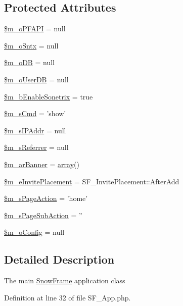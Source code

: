 \subsection*{Protected Attributes}
\begin{DoxyCompactItemize}
\item 
\hyperlink{classSF__App_a23d5b5190ee32c4eb8fff028844b1fa6}{\$m\_\-oPFAPI} = null
\item 
\hyperlink{classSF__App_a22d1091f94c58e3533304abe3eb9e9fe}{\$m\_\-oSntx} = null
\item 
\hyperlink{classSF__App_af0fd242fc474881efab473522eec0748}{\$m\_\-oDB} = null
\item 
\hyperlink{classSF__App_a480a834e33015cc9a001d1d84972bb12}{\$m\_\-oUserDB} = null
\item 
\hyperlink{classSF__App_a55534a049a693ced372dba4331e5e9bd}{\$m\_\-bEnableSonetrix} = true
\item 
\hyperlink{classSF__App_a21ffd6ebc459ccba9514cbaee05b2ece}{\$m\_\-sCmd} = 'show'
\item 
\hyperlink{classSF__App_a2db945fecc9d0f95e19093d7829be78d}{\$m\_\-sIPAddr} = null
\item 
\hyperlink{classSF__App_a251ed856d45aa28d717a012291b71d26}{\$m\_\-sReferrer} = null
\item 
\hyperlink{classSF__App_a03606a66e78d358c6094f05f0857845d}{\$m\_\-arBanner} = \hyperlink{list_8php_aa3205d038c7f8feb5c9f01ac4dfadc88}{array}()
\item 
\hyperlink{classSF__App_a78a5b97e38e7a2bc9e36cca0a97a2cca}{\$m\_\-eInvitePlacement} = SF\_\-InvitePlacement::AfterAdd
\item 
\hyperlink{classSF__App_a82cc1f3844569fa451cac5abc03b1a4d}{\$m\_\-sPageAction} = 'home'
\item 
\hyperlink{classSF__App_a980e6fd9e83172281b1e6dac50f16e9c}{\$m\_\-sPageSubAction} = ''
\item 
\hyperlink{classSF__App_a0af2b37a09c1015be10cfa60f3f1d1b9}{\$m\_\-oConfig} = null
\end{DoxyCompactItemize}


\subsection{Detailed Description}
The main \hyperlink{classSnowFrame}{SnowFrame} application class 

Definition at line 32 of file SF\_\-App.php.



